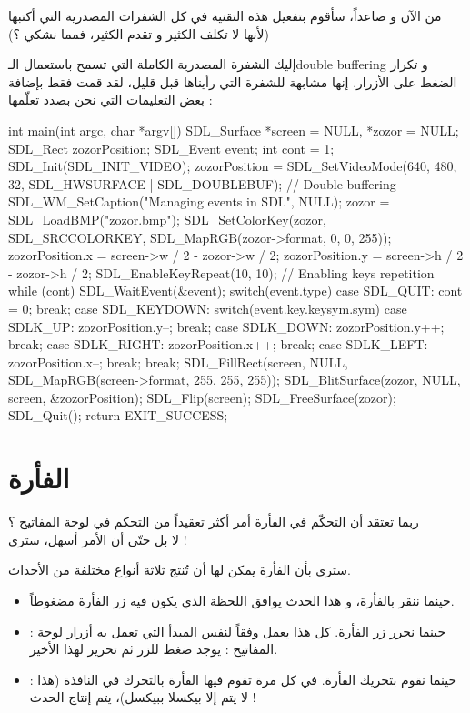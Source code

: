 من الآن و صاعداً، سأقوم بتفعيل هذه التقنية في كل الشفرات المصدرية التي أكتبها (لأنها لا تكلف الكثير و تقدم الكثير، فمما نشكي ؟)

إليك الشفرة المصدرية الكاملة التي تسمح باستعمال الـ\textenglish{double buffering}
و تكرار الضغط على الأزرار. إنها مشابهة للشفرة التي رأيناها قبل قليل، لقد قمت فقط بإضافة بعض التعليمات التي نحن بصدد تعلّمها :

\begin{Csource}
int main(int argc, char *argv[])
{
	SDL_Surface *screen = NULL, *zozor = NULL;
	SDL_Rect zozorPosition;
	SDL_Event event;
	int cont = 1;
	SDL_Init(SDL_INIT_VIDEO);
	zozorPosition = SDL_SetVideoMode(640, 480, 32, SDL_HWSURFACE | SDL_DOUBLEBUF); // Double buffering
	SDL_WM_SetCaption("Managing events in SDL", NULL);
	zozor = SDL_LoadBMP("zozor.bmp");
	SDL_SetColorKey(zozor, SDL_SRCCOLORKEY, SDL_MapRGB(zozor->format, 0, 0, 255));
	zozorPosition.x = screen->w / 2 - zozor->w / 2;
	zozorPosition.y = screen->h / 2 - zozor->h / 2;
	SDL_EnableKeyRepeat(10, 10); // Enabling keys repetition
	while (cont)
	{
		SDL_WaitEvent(&event);
		switch(event.type)
		{
			case SDL_QUIT:
			cont = 0;
			break;
			case SDL_KEYDOWN:
			switch(event.key.keysym.sym)
			{
				case SDLK_UP:
				zozorPosition.y--;
				break;
				case SDLK_DOWN:
				zozorPosition.y++;
				break;
				case SDLK_RIGHT:
				zozorPosition.x++;
				break;
				case SDLK_LEFT:
				zozorPosition.x--;
				break;
			}
			break;
		}
		SDL_FillRect(screen, NULL, SDL_MapRGB(screen->format, 255, 255, 255));
		SDL_BlitSurface(zozor, NULL, screen, &zozorPosition);
		SDL_Flip(screen);
	}
	SDL_FreeSurface(zozor);
	SDL_Quit();
	return EXIT_SUCCESS;
}
\end{Csource}

\section{الفأرة}

ربما تعتقد أن التحكّم في الفأرة أمر أكثر تعقيداً من التحكم في لوحة المفاتيح ؟\\
لا بل حتّى أن الأمر أسهل، سترى !

سترى بأن الفأرة يمكن لها أن تُنتج ثلاثة أنواع مختلفة من الأحداث.

\begin{itemize}
	\item {}
	حينما ننقر بالفأرة، و هذا الحدث يوافق اللحظة الذي يكون فيه زر الفأرة مضغوطاً.
	\item {} :
	حينما نحرر زر الفأرة. كل هذا يعمل وفقاً لنفس المبدأ التي تعمل به أزرار لوحة المفاتيح : يوجد ضغط للزر ثم تحرير لهذا الأخير.
	\item {} :
	حينما نقوم بتحريك الفأرة. في كل مرة تقوم فيها الفأرة بالتحرك في النافذة (هذا لا يتم إلا بيكسلا ببيكسل)، يتم إنتاج الحدث 
	 !
\end{itemize}
 
